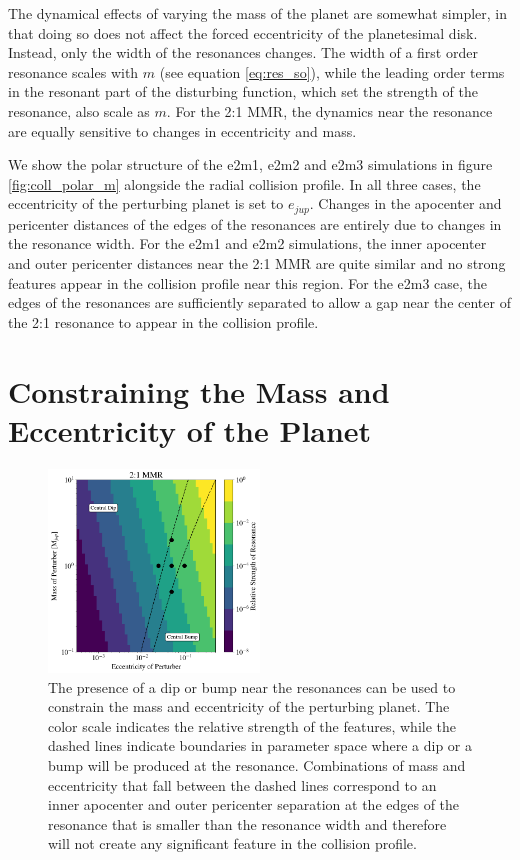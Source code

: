 \documentclass[twocolumn]{aastex63}
\begin{document}
The dynamical effects of varying the mass of the planet are somewhat simpler, in that doing so does not affect the forced eccentricity of the 
planetesimal disk. Instead, only the width of the resonances changes. The width of a first order resonance scales with $m$ (see equation 
\ref{eq:res_so}), while the leading order terms in the resonant part of the disturbing function, which set the strength of the resonance, also scale as 
$m$. For the 2:1 MMR, the dynamics near the resonance are equally sensitive to changes in eccentricity and mass.

We show the polar structure of the e2m1, e2m2 and e2m3 simulations in figure \ref{fig:coll_polar_m} alongside the radial collision profile. In all three 
cases, the eccentricity of the perturbing planet is set to $e_{jup}$. Changes in the apocenter and pericenter distances of the edges of the 
resonances are entirely due to changes in the resonance width. For the e2m1 and e2m2 simulations, the inner apocenter and outer pericenter 
distances near the 2:1 MMR are quite similar and no strong features appear in the collision profile near this region. For the e2m3 case, the edges of 
the resonances are sufficiently separated to allow a gap near the center of the 2:1 resonance to appear in the collision profile.

\section{Constraining the Mass and Eccentricity of the Planet}\label{sec:constrain}

\begin{figure}
\begin{center}
    \includegraphics[width=0.5\textwidth]{figures/bump_dip_diag.png}
    \caption{The presence of a dip or bump near the resonances can be used to constrain the mass and eccentricity
    of the perturbing planet. The color scale indicates the relative strength of the features, while the dashed lines
    indicate boundaries in parameter space where a dip or a bump will be produced at the resonance. Combinations of mass and eccentricity that fall 
    between the dashed lines correspond to an inner apocenter and outer pericenter separation at the edges of the resonance that is smaller than the 
    resonance width and therefore will not create any significant feature in the collision profile.\label{fig:bump_dip_diag}}
\end{center}
\end{figure}
\end{document}
